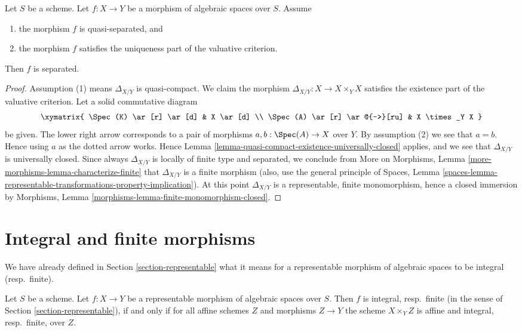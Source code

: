 \begin{lemma}
\label{lemma-valuative-criterion-separatedness}
Let $S$ be a scheme.
Let $f : X \to Y$ be a morphism of algebraic spaces over $S$.
Assume
\begin{enumerate}
\item the morphism $f$ is quasi-separated, and
\item the morphism $f$ satisfies the uniqueness
part of the valuative criterion.
\end{enumerate}
Then $f$ is separated.
\end{lemma}

\begin{proof}
Assumption (1) means $\Delta_{X/Y}$ is quasi-compact.
We claim the morphism
$\Delta_{X/Y} : X \to X \times_Y X$ satisfies the existence
part of the valuative criterion.
Let a solid commutative diagram
$$
\xymatrix{
\Spec(K) \ar[r] \ar[d] & X \ar[d] \\
\Spec(A) \ar[r] \ar@{-->}[ru] & X \times_Y X
}
$$
be given. The lower right arrow corresponds to a
pair of morphisms $a, b : \Spec(A) \to X$ over $Y$.
By assumption (2) we see that $a = b$. Hence using $a$ as the dotted
arrow works. Hence
Lemma \ref{lemma-quasi-compact-existence-universally-closed}
applies, and we see that $\Delta_{X/Y}$ is universally closed.
Since always $\Delta_{X/Y}$ is locally of finite type and
separated, we conclude from
More on Morphisms, Lemma \ref{more-morphisms-lemma-characterize-finite}
that $\Delta_{X/Y}$ is a finite morphism (also, use the
general principle of
Spaces, Lemma
\ref{spaces-lemma-representable-transformations-property-implication}).
At this point $\Delta_{X/Y}$ is a representable, finite monomorphism,
hence a closed immersion by
Morphisms, Lemma \ref{morphisms-lemma-finite-monomorphism-closed}.
\end{proof}







\section{Integral and finite morphisms}
\label{section-integral}

\noindent
We have already defined in Section \ref{section-representable}
what it means for a representable morphism of algebraic spaces
to be integral (resp.\ finite).

\begin{lemma}
\label{lemma-integral-representable}
Let $S$ be a scheme. Let $f : X \to Y$ be a representable
morphism of algebraic spaces over $S$. Then
$f$ is integral, resp.\ finite
(in the sense of Section \ref{section-representable}),
if and only if for all affine schemes $Z$
and morphisms $Z \to Y$ the scheme $X \times_Y Z$ is affine and
integral, resp.\ finite, over $Z$.
\end{lemma}

